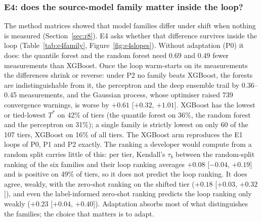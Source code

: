 \documentclass[11pt,a4paper]{article}
\begin{document}
\subsubsection{E4: does the source-model family matter inside the loop?}
\label{sec:e4}
The method matrices showed that model families differ under shift when nothing is measured
(Section~\ref{sec:r8}). E4 asks whether that difference survives inside the loop
(Table~\ref{tab:e4family}, Figure~\ref{fig:e4slopes}). Without adaptation (P0) it does: the quantile forest and the random
forest need 0.69 and 0.49 fewer measurements than XGBoost. Once the loop warm-starts on its
measurements the differences shrink or reverse: under P2 no family beats XGBoost, the forests are
indistinguishable from it, the perceptron and the deep ensemble trail by 0.36--0.45
measurements, and the Gaussian process, whose optimiser raised 739 convergence warnings, is worse by
$+0.61$ [$+0.32$, $+1.01$]. XGBoost has the lowest or tied-lowest $T^{*}$ on 42\% of tiers (the quantile forest on 36\%, the random forest and the perceptron on 31\%); a single family is strictly lowest on only 60 of the 107 tiers, XGBoost on 16\% of all tiers. The XGBoost arm
reproduces the E1 loops of P0, P1 and P2 exactly. The ranking a developer would compute from a random
split carries little of this: per tier, Kendall's $\tau_b$ between the random-split ranking of the six
families and their loop ranking averages $+0.08$ [$-0.04$, $+0.19$] and is positive on 49\%
of tiers, so it does not predict the loop ranking. It does agree, weakly, with the zero-shot ranking on
the shifted tier ($+0.18$ [$+0.03$, $+0.32$]), and even the label-informed zero-shot ranking
predicts the loop ranking only weakly ($+0.23$ [$+0.04$, $+0.40$]). Adaptation absorbs most of
what distinguishes the families; the choice that matters is to adapt.
\end{document}
